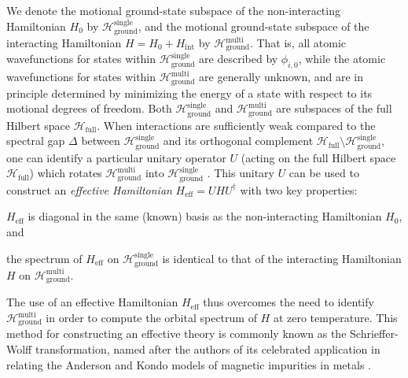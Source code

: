\documentclass[preprint,showkeys,nofootinbib]{revtex4-1}
\renewcommand{\t}{\text} %
\renewcommand{\H}{\mathcal{H}}
\newcommand{\1}{\mathds{1}}
\begin{document}
We denote the motional ground-state subspace of the non-interacting
Hamiltonian $H_0$ by $\H_{\t{ground}}^{\t{single}}$, and the motional
ground-state subspace of the interacting Hamiltonian
$H = H_0 + H_{\t{int}}$ by $\H_{\t{ground}}^{\t{multi}}$.  That is,
all atomic wavefunctions for states within
$\H_{\t{ground}}^{\t{single}}$ are described by $\phi_{i,0}$, while
the atomic wavefunctions for states within
$\H_{\t{ground}}^{\t{multi}}$ are generally unknown, and are in
principle determined by minimizing the energy of a state with respect
to its motional degrees of freedom.  Both
$\H_{\t{ground}}^{\t{single}}$ and $\H_{\t{ground}}^{\t{multi}}$ are
subspaces of the full Hilbert space $\H_{\t{full}}$.  When
interactions are sufficiently weak compared to the spectral gap
$\Delta$ between $\H_{\t{ground}}^{\t{single}}$ and its orthogonal
complement $\H_{\t{full}}\setminus\H_{\t{ground}}^{\t{single}}$, one
can identify a particular unitary operator $U$ (acting on the full
Hilbert space $\H_{\t{full}}$) which rotates
$\H_{\t{ground}}^{\t{multi}}$ into $\H_{\t{ground}}^{\t{single}}$
\cite{bravyi2011schrieffer}.  This unitary $U$ can be used to
construct an {\it effective Hamiltonian} $H_{\t{eff}} = U H U^\dag$
with two key properties:
\begin{enumerate*}
\item $H_{\t{eff}}$ is diagonal in the same (known) basis as the
  non-interacting Hamiltonian $H_0$, and
\item the spectrum of $H_{\t{eff}}$ on $\H_{\t{ground}}^{\t{single}}$
  is identical to that of the interacting Hamiltonian $H$ on
  $\H_{\t{ground}}^{\t{multi}}$.
\end{enumerate*}
The use of an effective Hamiltonian $H_{\t{eff}}$ thus overcomes the
need to identify $\H_{\t{ground}}^{\t{multi}}$ in order to compute the
orbital spectrum of $H$ at zero temperature.  This method for
constructing an effective theory is commonly known as the
Schrieffer-Wolff transformation, named after the authors of its
celebrated application in relating the Anderson and Kondo models of
magnetic impurities in metals \cite{schrieffer1966relation}.
\end{document}
